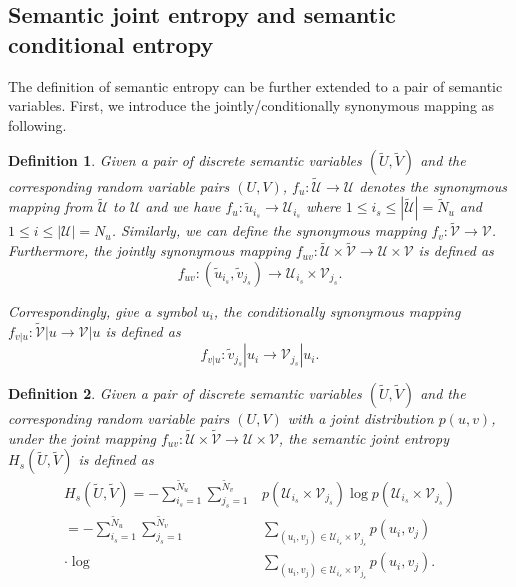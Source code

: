 \documentclass[12pt, draftclsnofoot,onecolumn]{IEEEtran}
\newtheorem{definition}{\bf{Definition}}
\begin{document}
\subsection{Semantic joint entropy and semantic conditional entropy}
The definition of semantic entropy can be further extended to a pair of semantic variables. First, we introduce the jointly/conditionally synonymous mapping as following.
\begin{definition}
Given a pair of discrete semantic variables $(\tilde {U},\tilde {V})$ and the corresponding random variable pairs $\left(U,V\right)$, $f_{u}: \tilde {\mathcal{U}} \to \mathcal{U}$ denotes the synonymous mapping from $\tilde {\mathcal{U}}$ to $\mathcal{U}$ and we have $f_{u}: \tilde{u}_{i_s} \to \mathcal{U}_{i_s}$ where $1\leq i_s\leq |\tilde {\mathcal{U}}|={\tilde{N}}_u$ and $1\leq i \leq\left| {\mathcal{U}}\right|=N_u$. Similarly, we can define the synonymous mapping $f_{v}: \tilde {\mathcal{V}} \to \mathcal{V}$. Furthermore, the jointly synonymous mapping $f_{uv}: \tilde {\mathcal{U}}\times \tilde{\mathcal{V}}\to \mathcal{U}\times{\mathcal{V}}$ is defined as
\begin{equation}
f_{uv}: (\tilde{u}_{i_s},\tilde{v}_{j_s}) \to \mathcal{U}_{i_s}\times \mathcal{V}_{j_s}.
\end{equation}

Correspondingly, give a symbol $u_i$, the conditionally synonymous mapping $f_{v|u}: \tilde {\mathcal{V}}|u \to \mathcal{V}|u$ is defined as
\begin{equation}
f_{v|u}: \tilde{v}_{j_s}|u_i \to \mathcal{V}_{j_s}|u_i.
\end{equation}
\end{definition}

\begin{definition}
Given a pair of discrete semantic variables $(\tilde {U},\tilde {V})$ and the corresponding random variable pairs $\left(U,V\right)$ with a joint distribution $p(u,v)$, under the joint mapping $f_{uv}: \tilde {\mathcal{U}}\times \tilde{\mathcal{V}}\to \mathcal{U}\times{\mathcal{V}}$, the semantic joint entropy $H_s(\tilde {U},\tilde {V})$ is defined as
\begin{equation}\label{joint_semantic_entropy}
\begin{aligned}
H_s(\tilde {U},\tilde {V})=-\sum_{i_s=1}^{{\tilde{N}}_u}\sum_{j_s=1}^{{\tilde{N}}_v}&p\left(\mathcal{U}_{i_s}\times\mathcal{V}_{j_s}\right) \log p\left(\mathcal{U}_{i_s}\times\mathcal{V}_{j_s}\right)  \\
=-\sum_{i_s=1}^{{\tilde{N}}_u}\sum_{j_s=1}^{{\tilde{N}}_v} &\sum_{(u_i,v_j)\in \mathcal{U}_{i_s}\times \mathcal{V}_{j_s}} p\left(u_i,v_j\right)\\
\cdot \log &\sum_{(u_i,v_j)\in \mathcal{U}_{i_s}\times \mathcal{V}_{j_s}} p\left(u_i,v_j\right).
\end{aligned}
\end{equation}
\end{definition}
\end{document}
